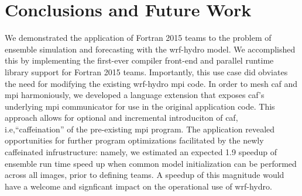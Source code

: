 \section{Conclusions and Future Work}\label{sec:conclusions}
We demonstrated the application of Fortran 2015 teams to the problem of ensemble
simulation and forecasting with the \gls{wrf-hydro} model. We accomplished this by
implementing the first-ever compiler front-end and parallel runtime library support
for Fortran 2015 teams.  Importantly, this use case did obviates the need for modifying
the existing \gls{wrf-hydro} \gls{mpi} code.  In order to mesh \gls{caf} and \gls{mpi}
harmoniously, we developed a language extension that exposes \gls{caf}'s underlying
\gls{mpi} communicator for use in the original application code.  This approach allows
for optional and incremental introduciton of \gls{caf}, i.e,``caffeination'' of the
pre-existing \gls{mpi} program. The application revealed opportunities for further
program optimizations facilitated by the newly caffeinated infrustructure:
namely, we estimated an expected 1.9 speedup of ensemble run time speed up when
common model initialization can be performed across all images, prior to defining teams.
A speedup of this magnitude would have a welcome and signficant impact on the operational
use of \gls{wrf-hydro}.




